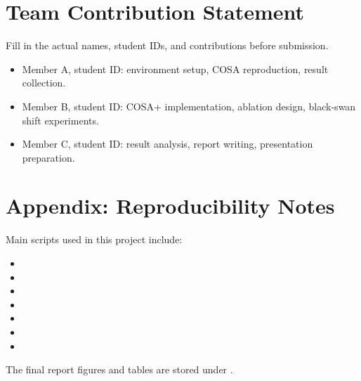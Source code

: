 \documentclass[10pt]{article}
\begin{document}
\section*{Team Contribution Statement}
Fill in the actual names, student IDs, and contributions before submission.
\begin{itemize}
  \item Member A, student ID: environment setup, COSA reproduction, result collection.
  \item Member B, student ID: COSA+ implementation, ablation design, black-swan shift experiments.
  \item Member C, student ID: result analysis, report writing, presentation preparation.
\end{itemize}

\section*{Appendix: Reproducibility Notes}
Main scripts used in this project include:
\begin{itemize}
  \item {}
  \item {}
  \item {}
  \item {}
  \item {}
  \item {}
  \item {}
\end{itemize}
The final report figures and tables are stored under .
\end{document}
